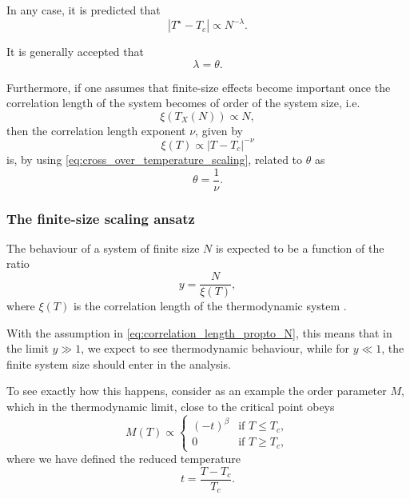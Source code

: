 In any case, it is predicted that
\begin{equation}
  |T^{\star} - T_c| \propto N^{-\lambda}.
\end{equation}

It is generally accepted that \cite{barber1983finite}
\begin{equation}
  \lambda = \theta.
\end{equation}

Furthermore, if one assumes that finite-size effects become important once the correlation length of the system becomes of order of the system size, i.e. \cite{fisher1967interfacial}
\begin{equation}\label{eq:correlation_length_propto_N}
  \xi(T_X(N)) \propto N,
\end{equation}
then the correlation length exponent $\nu$, given by
\begin{equation}
  \xi(T) \propto |T - T_c|^{-\nu}
\end{equation}
is, by using \autoref{eq:cross_over_temperature_scaling}, related to $\theta$ as
\begin{equation}
  \theta = \frac{1}{\nu}.
\end{equation}

\subsubsection{The finite-size scaling ansatz}

The behaviour of a system of finite size $N$ is expected to be a function of the ratio
\begin{equation}
  y = \frac{N}{\xi(T)},
\end{equation}
where $\xi(T)$ is the correlation length of the thermodynamic system \cite{fisher1972scaling}.


With the assumption in \autoref{eq:correlation_length_propto_N}, this means that in the limit $y \gg 1$,
we expect to see thermodynamic behaviour, while for $y \ll 1$,
the finite system size should enter in the analysis.

To see exactly how this happens, consider as an example the order parameter $M$,
which in the thermodynamic limit, close to the critical point obeys
\begin{equation}
  M(T) \propto
  \begin{cases}
    (-t)^{\beta} & \text{if } T \leq T_c, \\
    0 & \text{if } T \geq T_c,
  \end{cases}
\end{equation}
where we have defined the reduced temperature
\begin{equation}
  t = \frac{T - T_c}{T_c}.
\end{equation}

